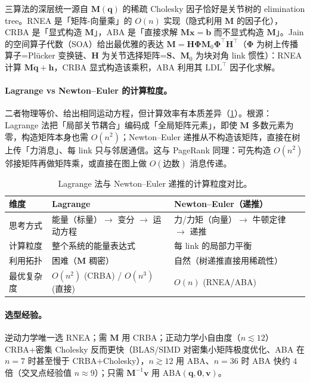 \begin{insight}
三算法的深层统一源自 $\mathbf M(\mathbf q)$ 的稀疏 Cholesky 因子恰好是关节树的 elimination tree。RNEA 是「矩阵-向量乘」的 $O(n)$ 实现（隐式利用 $\mathbf M$ 的因子化），CRBA 是「显式构造 $\mathbf M$」，ABA 是「直接求解 $\mathbf M\mathbf x=\mathbf b$ 而不显式构造 $\mathbf M$」。Jain 的空间算子代数（SOA）给出最优雅的表达 $\mathbf M=\mathbf H\boldsymbol\Phi\mathbf M_0\boldsymbol\Phi^\top\mathbf H^\top$\cite{jain2011robot}（$\boldsymbol\Phi$ 为树上传播算子=Plücker 变换链、$\mathbf H$ 为关节选择矩阵=$\mathbf S$、$\mathbf M_0$ 为块对角 link 惯性）：RNEA 计算 $\mathbf M\ddot{\mathbf q}+\mathbf h$，CRBA 显式构造该乘积，ABA 利用其 $\mathrm{LDL}^\top$ 因子化求解。
\end{insight}

\paragraph{Lagrange vs Newton--Euler 的计算粒度。}
二者物理等价、给出相同运动方程，但计算效率有本质差异（\cref{tab:on-lag-ne}）。根源：Lagrange 法把「局部关节耦合」编码成「全局矩阵元素」，即使 $\mathbf M$ 多数元素为零，构造矩阵本身也需 $O(n^2)$；Newton--Euler 递推从不构造该矩阵，直接在树上传「力消息」、每 link 只与邻居通信。这与 PageRank 同理：可先构造 $O(n^2)$ 邻接矩阵再做矩阵乘，或直接在图上做 $O(\text{边数})$ 消息传递。

\begin{table}[H]\centering\small
\caption{Lagrange 法与 Newton--Euler 递推的计算粒度对比。}
\label{tab:on-lag-ne}
\begin{tabular}{lll}
\toprule
维度 & Lagrange & Newton--Euler（递推） \\
\midrule
思考方式 & 能量（标量）$\to$ 变分 $\to$ 运动方程 & 力/力矩（向量）$\to$ 牛顿定律 $\to$ 递推 \\
计算粒度 & 整个系统的能量表达式 & 每 link 的局部力平衡 \\
利用拓扑 & 困难（$\mathbf M$ 稠密） & 自然（树递推直接用稀疏性） \\
最优复杂度 & $O(n^2)$ (CRBA) / $O(n^3)$ (直接) & $O(n)$ (RNEA/ABA) \\
\bottomrule
\end{tabular}
\end{table}

\paragraph{选型经验。}
逆动力学唯一选 RNEA；需 $\mathbf M$ 用 CRBA；正动力学小自由度（$n\lesssim12$）CRBA+密集 Cholesky 反而更快（BLAS/SIMD 对密集小矩阵极度优化、ABA 在 $n=7$ 时甚至慢于 CRBA+Cholesky），$n\gtrsim12$ 用 ABA、$n=36$ 时 ABA 快约 4 倍（交叉点经验值 $n\approx9$\cite{featherstone2008rigid}）；只需 $\mathbf M^{-1}\mathbf v$ 用 $\mathrm{ABA}(\mathbf q,\mathbf 0,\mathbf v)$。

